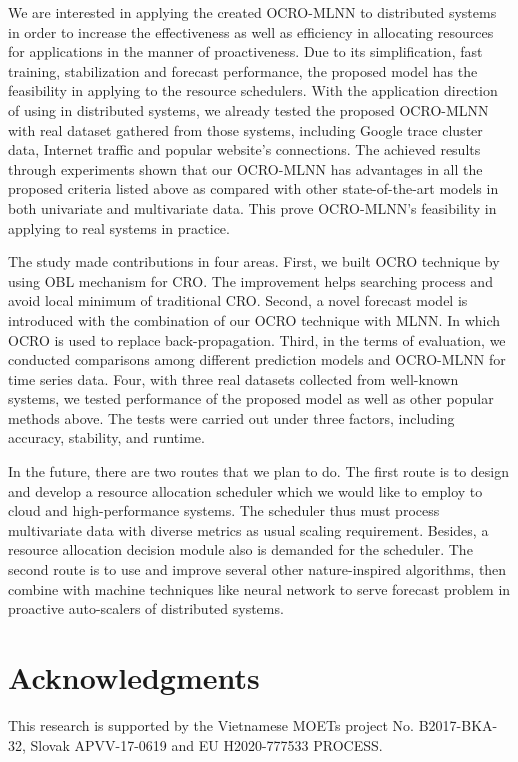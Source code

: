 \documentclass[smallcondensed, natbib]{svjour3}     %
\begin{document}
{We are interested in applying the created OCRO-MLNN to distributed systems in order to increase the effectiveness as well as efficiency in allocating resources for applications in the manner of proactiveness. Due to its simplification, fast training, stabilization and forecast performance, the proposed model has the feasibility in applying to the resource schedulers. With the application direction of using in distributed systems, we already tested the proposed OCRO-MLNN with real dataset gathered from those systems, including Google trace cluster data, Internet traffic and popular website's connections. The achieved results through experiments shown that our OCRO-MLNN has advantages in all the proposed criteria listed above as compared with other state-of-the-art models in both univariate and multivariate data. This prove OCRO-MLNN's feasibility in applying to real systems in practice.

The study made contributions in four areas. First, we built OCRO technique by using OBL mechanism for CRO. The improvement helps searching process and avoid local minimum of traditional CRO. Second, a novel forecast model is introduced with the combination of our OCRO technique with MLNN. In which OCRO is used to replace back-propagation. Third, in the terms of evaluation, we conducted comparisons among different prediction models and OCRO-MLNN for time series data. Four, with three real datasets collected from well-known systems, we tested performance of the proposed model as well as other popular methods above. The tests were carried out under three factors, including accuracy, stability, and runtime.

In the future, there are two routes that we plan to do. The first route is to design and develop a resource allocation scheduler which we would like to employ to cloud and high-performance systems. The scheduler thus must process multivariate data with diverse metrics as usual scaling requirement. Besides, a resource allocation decision module also is demanded for the scheduler. The second route is to use and improve several other nature-inspired algorithms, then combine with machine techniques like neural network to serve forecast problem in proactive auto-scalers of distributed systems.

\section*{Acknowledgments} This research is supported by the 
Vietnamese MOETs project No. B2017-BKA-32, Slovak APVV-17-0619 and EU H2020-777533 PROCESS.


}
\end{document}
